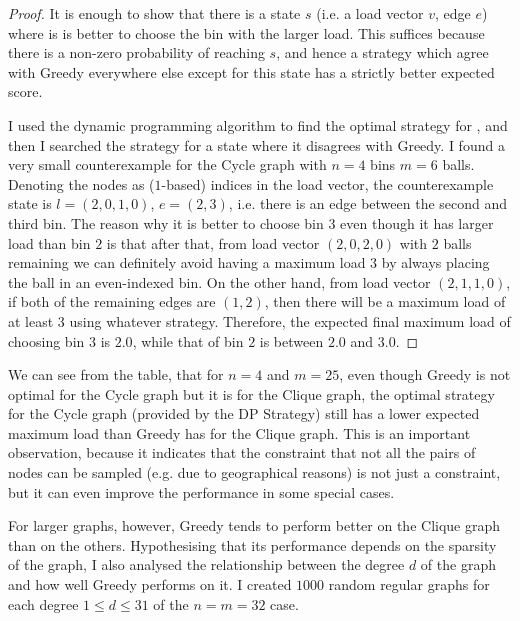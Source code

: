 \begin{proof}
It is enough to show that there is a state $s$ (i.e. a load vector $v$, edge $e$) where is is better to choose the bin with the larger load. This suffices because there is a non-zero probability of reaching $s$, and hence a strategy which agree with Greedy everywhere else except for this state has a strictly better expected score.


I used the dynamic programming algorithm to find the optimal strategy for \GraphicalTwoChoice, and then I searched the strategy for a state where it disagrees with Greedy. I found a very small counterexample for the Cycle graph with $n=4$ bins $m=6$ balls. Denoting the nodes as ($1$-based) indices in the load vector, the counterexample state is $l=(2,0,1,0)$,  $e=(2,3)$, i.e. there is an edge between the second and third bin. The reason why it is better to choose bin $3$ even though it has larger load than bin $2$ is that after that, from load vector $(2,0,2,0)$ with $2$ balls remaining we can definitely avoid having a maximum load $3$ by always placing the ball in an even-indexed bin. On the other hand, from load vector $(2,1,1,0)$, if both of the remaining edges are $(1,2)$, then there will be a maximum load of at least $3$ using whatever strategy. Therefore, the expected final maximum load of choosing bin $3$ is $2.0$, while that of bin $2$ is between $2.0$ and $3.0$.
\end{proof}


We can see from the table, that for $n=4$ and $m=25$, even though Greedy is not optimal for the Cycle graph but it is for the Clique graph, the optimal strategy for the Cycle graph (provided by the DP Strategy) still has a lower expected maximum load than Greedy has for the Clique graph. This is an important observation, because it indicates that the constraint that not all the pairs of nodes can be sampled (e.g. due to geographical reasons) is not just a constraint, but it can even improve the performance in some special cases.


For larger graphs, however, Greedy tends to perform better on the Clique graph than on the others. Hypothesising that its performance depends on the sparsity of the graph, I also analysed the relationship between the degree $d$ of the graph and how well Greedy performs on it. I created $1000$ random regular graphs for each degree $1\leq d \leq 31$ of the $n=m=32$ case. 




